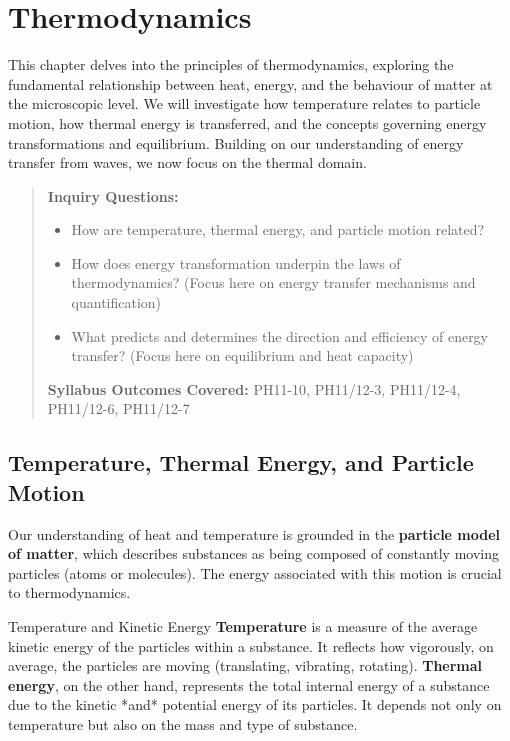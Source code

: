 
\chapter{Thermodynamics}
\label{ch:thermodynamics}
\FloatBarrier %

This chapter delves into the principles of thermodynamics, exploring the fundamental relationship between heat, energy, and the behaviour of matter at the microscopic level. We will investigate how temperature relates to particle motion, how thermal energy is transferred, and the concepts governing energy transformations and equilibrium. Building on our understanding of energy transfer from waves, we now focus on the thermal domain.

\blockquote{
\textbf{Inquiry Questions:}
\begin{itemize}
    \item How are temperature, thermal energy, and particle motion related?
    \item How does energy transformation underpin the laws of thermodynamics? (Focus here on energy transfer mechanisms and quantification)
    \item What predicts and determines the direction and efficiency of energy transfer? (Focus here on equilibrium and heat capacity)
\end{itemize}
\textbf{Syllabus Outcomes Covered:} PH11-10, PH11/12-3, PH11/12-4, PH11/12-6, PH11/12-7
}

\section{Temperature, Thermal Energy, and Particle Motion}
\label{sec:temp_energy_particle}
\FloatBarrier

Our understanding of heat and temperature is grounded in the \textbf{particle model of matter}, which describes substances as being composed of constantly moving particles (atoms or molecules). The energy associated with this motion is crucial to thermodynamics.

\begin{keyconcept}{Temperature and Kinetic Energy}
\textbf{Temperature} is a measure of the average kinetic energy of the particles within a substance. It reflects how vigorously, on average, the particles are moving (translating, vibrating, rotating). \textbf{Thermal energy}, on the other hand, represents the total internal energy of a substance due to the kinetic *and* potential energy of its particles. It depends not only on temperature but also on the mass and type of substance.
\end{keyconcept}


